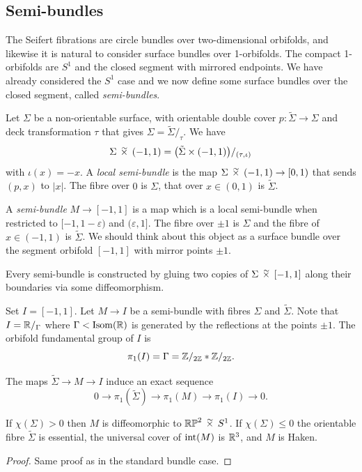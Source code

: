 \subsection{Semi-bundles}
The Seifert fibrations are circle bundles over two-dimensional orbifolds, and likewise it is natural to consider surface bundles over 1-orbifolds. The compact 1-orbifolds are $S^1$ and the closed segment with mirrored endpoints. We have already considered the $S^1$ case and we now define some surface bundles over the closed segment, called \emph{semi-bundles}.

Let $\Sigma$ be a non-orientable surface, with orientable double cover $p\colon \tilde \Sigma \to \Sigma$ and deck transformation $\tau$ that gives $\Sigma=\tilde \Sigma/_\tau$. We have 
$$\Sigma\timtil (-1,1) = \big(\tilde \Sigma \times (-1,1)\big)/_{(\tau, \iota)}$$
with $\iota(x) = -x$. A \emph{local semi-bundle} is the map $\Sigma\timtil (-1,1) \to [0,1)$ that sends $(p,x)$ to $|x|$. The fibre over $0$ is $\Sigma$, that over $x\in (0,1)$ is $\tilde \Sigma$.

A \emph{semi-bundle} $M \to [-1,1]$ is a map which is a local semi-bundle when restricted to $[-1, 1-\varepsilon)$ and $(\varepsilon, 1]$. The fibre over $\pm 1$ is $\Sigma$ and the fibre of $x\in (-1,1)$ is $\tilde \Sigma$. We should think about this object as a surface bundle over the segment orbifold $[-1,1]$ with mirror points $\pm 1$. 

\begin{ex}
Every semi-bundle is constructed by gluing two copies of $\Sigma\timtil [-1,1]$ along their boundaries via some diffeomorphism.
\end{ex}

Set $I = [-1,1]$. Let $M\to I$ be a semi-bundle with fibres $\Sigma$ and $\tilde \Sigma$.
Note that $I=\mathbb{R}/_\Gamma$ where $\Gamma<{\rm Isom}(\mathbb{R})$ is generated by the reflections at the points $\pm 1$. The orbifold fundamental group of $I$ is 
$$\pi_1(I) = \Gamma = \mathbb{Z}/_{2\mathbb{Z}} * \mathbb{Z}/_{2\mathbb{Z}}.$$

\begin{ex}
The maps $\tilde\Sigma\to M \to I$ induce an exact sequence
$$0 \longrightarrow \pi_1(\tilde \Sigma) \longrightarrow \pi_1(M) \longrightarrow \pi_1(I) \longrightarrow 0.$$
\end{ex}

\begin{prop}
If $\chi(\Sigma)>0$ then $M$ is diffeomorphic to $\matRP^2 \timtil S^1$. If $\chi(\Sigma)\leqslant 0$ the orientable fibre $\tilde \Sigma$ is essential, the universal cover of ${\rm int}(M)$ is $\mathbb{R}^3$, and $M$ is Haken.
\end{prop}
\begin{proof}
Same proof as in the standard bundle case.
\end{proof}

